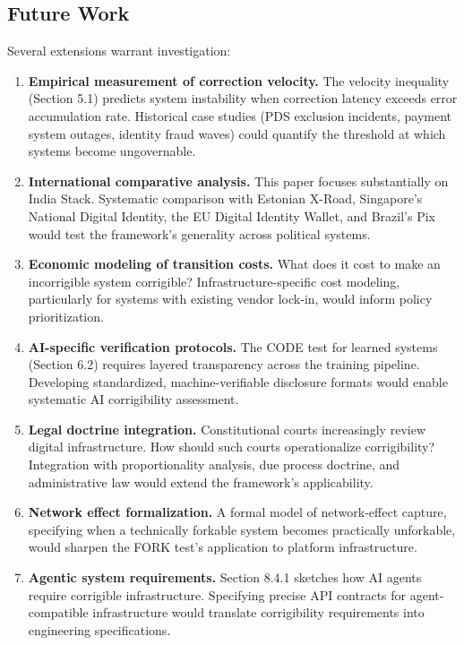 \subsection{Future Work}

Several extensions warrant investigation:

\begin{enumerate}
    \item \textbf{Empirical measurement of correction velocity.} The velocity inequality (Section 5.1) predicts system instability when correction latency exceeds error accumulation rate. Historical case studies (PDS exclusion incidents, payment system outages, identity fraud waves) could quantify the threshold at which systems become ungovernable.

    \item \textbf{International comparative analysis.} This paper focuses substantially on India Stack. Systematic comparison with Estonian X-Road, Singapore's National Digital Identity, the EU Digital Identity Wallet, and Brazil's Pix would test the framework's generality across political systems.

    \item \textbf{Economic modeling of transition costs.} What does it cost to make an incorrigible system corrigible? Infrastructure-specific cost modeling, particularly for systems with existing vendor lock-in, would inform policy prioritization.

    \item \textbf{AI-specific verification protocols.} The CODE test for learned systems (Section 6.2) requires layered transparency across the training pipeline. Developing standardized, machine-verifiable disclosure formats would enable systematic AI corrigibility assessment.

    \item \textbf{Legal doctrine integration.} Constitutional courts increasingly review digital infrastructure. How should such courts operationalize corrigibility? Integration with proportionality analysis, due process doctrine, and administrative law would extend the framework's applicability.

    \item \textbf{Network effect formalization.} A formal model of network-effect capture, specifying when a technically forkable system becomes practically unforkable, would sharpen the FORK test's application to platform infrastructure.

    \item \textbf{Agentic system requirements.} Section 8.4.1 sketches how AI agents require corrigible infrastructure. Specifying precise API contracts for agent-compatible infrastructure would translate corrigibility requirements into engineering specifications.
\end{enumerate}

